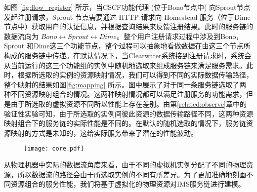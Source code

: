 如图 \ref{fig:flow_register} 所示，当CSCF功能代理 (位于Bono节点中) 向Sprout节点发起注册请求，Sprout 节点需要通过 HTTP 请求向 Homestead 服务（位于Dime节点中）获取用户的认证信息，并根据查询结果来反馈注册结果。此时的服务链的数据流向为 $Bono\longleftrightarrow Sprout\longleftrightarrow Dime$。整个用户注册请求过程中涉及到Bono，Sprout 和Dime这三个功能节点，整个过程可以抽象地看做数据在由这三个节点所构成的服务链中传递。在默认情况下，当Clearwater系统接到注册请求时，系统会从当前运行的这三个功能组的实例中随机地选取来组成服务链来满足服务需求。此时，根据所选取的实例的资源映射情况，我们可以得到不同的实际数据传输路径，整个映射的结果如图\ref{fig:mapping} 所示。图中展示了对于同一条服务链选取了两种不同资源映射组合的情况。这两种映射情况都可以满足注册服务的功能需求，但是由于所选取的虚拟资源不同所以性能上存在差别。由第\ref{related:observe}章中的验证性实验可知，由于所选取的实例间彼此资源的数据传输路径不同，这两种资源映射组合下的服务链的实际性能是不同的。在默认的随机选取的情况下，服务链资源映射的方式是未知的，这给实际服务带来了潜在的性能波动。
\newpage
\begin{figure}[!htp]
	\centering
	\texttt{[image: core.pdf]}
\end{figure}
从物理机器中实际的数据流角度来看，由于不同的虚拟机实例分配了不同的物理资源，所以数据流的路径会由于所选取实例的不同有所差异。为了更加准确地刻画不同资源组合的服务性能，我们将基于虚拟化的物理资源对IMS服务链进行建模。
\newpage


